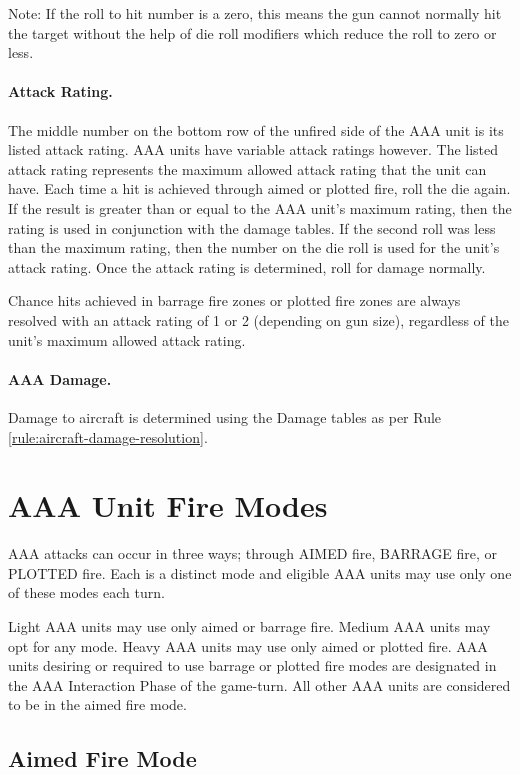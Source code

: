 Note:  If the roll to hit number is a zero, this means the gun cannot normally hit the target without the help of die roll modifiers which reduce the roll to zero or less.

\paragraph{Attack Rating.} The middle number on the bottom row of the unfired side of the AAA unit is its listed attack rating. AAA units have variable attack ratings however. The listed attack rating represents the maximum allowed attack rating that the unit can have. Each time a hit is achieved through aimed or plotted fire, roll the die again. If the result is greater than or equal to the AAA unit's maximum rating, then the rating is used in conjunction with the damage tables. If the second roll was less than the maximum rating, then the number on the die roll is used for the unit's attack rating. Once the attack rating is determined, roll for damage normally.

Chance hits achieved in barrage fire zones or plotted fire zones are always resolved with an attack rating of 1 or 2 (depending on gun size), regardless of the unit's maximum allowed attack rating.

\paragraph{AAA Damage.} Damage to aircraft is determined using the Damage tables as per Rule \ref{rule:aircraft-damage-resolution}.

\section{AAA Unit Fire Modes}

AAA attacks can occur in three ways; through AIMED fire, BARRAGE fire, or PLOTTED fire. Each is a distinct mode and eligible AAA units may use only one of these modes each turn.

Light AAA units may use only aimed or barrage fire. Medium AAA units may opt for any mode. Heavy AAA units may use only aimed or plotted fire. AAA units desiring or required to use barrage or plotted fire modes are designated in the AAA Interaction Phase of the game-turn. All other AAA units are considered to be in the aimed fire mode.

\subsection{Aimed Fire Mode}

